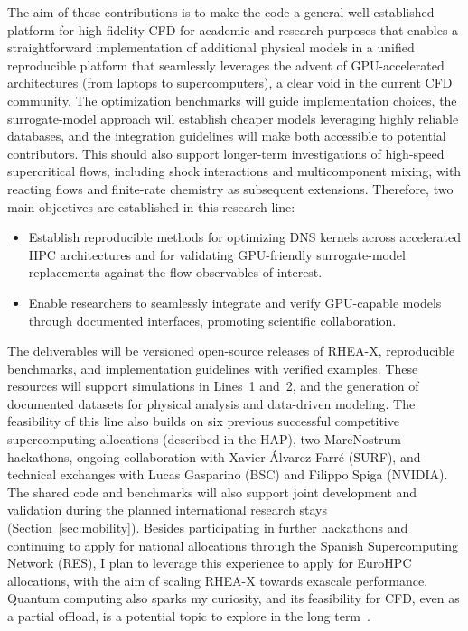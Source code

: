\documentclass[11pt]{article}
\begin{document}
The aim of these contributions is to make the code a general well-established platform for high-fidelity CFD for academic and research purposes that enables a straightforward implementation of additional physical models in a unified reproducible platform that seamlessly leverages the advent of GPU-accelerated architectures (from laptops to supercomputers), a clear void in the current CFD community. 
The optimization benchmarks will guide implementation choices, the surrogate-model approach will establish cheaper models leveraging highly reliable databases, and the integration guidelines will make both accessible to potential contributors. 
This should also support longer-term investigations of high-speed supercritical flows, including shock interactions and multicomponent mixing, with reacting flows and finite-rate chemistry as subsequent extensions.
Therefore, two main objectives are established in this research line:
\begin{itemize}
	\item[\textbf{O7.}] Establish reproducible methods for optimizing DNS kernels across accelerated HPC architectures and for validating GPU-friendly surrogate-model replacements against the flow observables of interest.
	\item[\textbf{O8.}] Enable researchers to seamlessly integrate and verify GPU-capable models through documented interfaces, promoting scientific collaboration.
\end{itemize}

The deliverables will be versioned open-source releases of RHEA-X, reproducible benchmarks, and implementation guidelines with verified examples. 
These resources will support simulations in Lines~1 and~2, and the generation of documented datasets for physical analysis and data-driven modeling. 
The feasibility of this line also builds on six previous successful competitive supercomputing allocations (described in the HAP), two MareNostrum hackathons, ongoing collaboration with Xavier Álvarez-Farré (SURF), and technical exchanges with Lucas Gasparino (BSC) and Filippo Spiga (NVIDIA). 
The shared code and benchmarks will also support joint development and validation during the planned international research stays (Section~\ref{sec:mobility}).
Besides participating in further hackathons and continuing to apply for national allocations through the Spanish Supercomputing Network (RES), I plan to leverage this experience to apply for EuroHPC allocations, with the aim of scaling RHEA-X towards exascale performance.
Quantum computing also sparks my curiosity, and its feasibility for CFD, even as a partial offload, is a potential topic to explore in the long term~\cite{Bharadwaj2023}.
\end{document}
